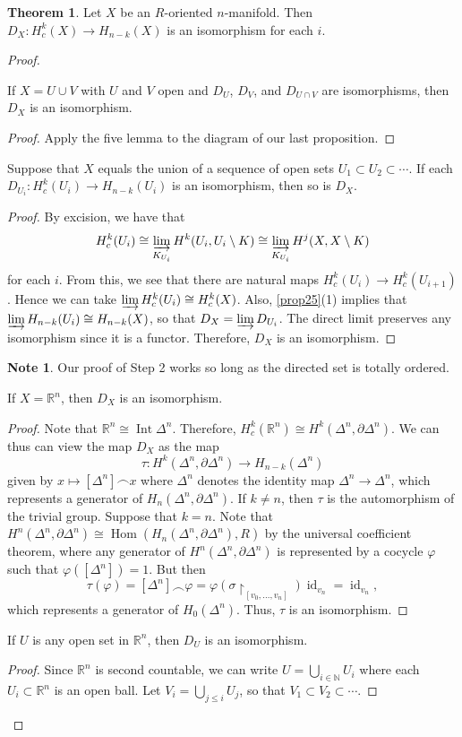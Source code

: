\documentclass[10pt,letterpaper,cm]{nupset}
\theoremstyle{definition}
\newtheorem{note}[definition]{Note}
\theoremstyle{theorem}
\newtheorem{theorem}[definition]{Theorem}
\theoremstyle{remark}
\newcommand{\N}{\mathbb N}
\newcommand{\R}{\mathbb{R}}
\newcommand{\1}{\mathbb{1}}
\newcommand{\0}{\vec 0}
\DeclareMathOperator{\id}{id}
\DeclareMathOperator{\Int}{Int}
\DeclareMathOperator{\Hom}{Hom}
\begin{document}
\begin{theorem}
Let $X$ be an $R$-oriented $n$-manifold.  Then $D_X : H_c^k(X) \to H_{n-k}(X)$ is an isomorphism for each $i$.
\end{theorem}
\begin{proof} $ $
\begin{steps}
\item If $X= U \cup V$ with $U$ and $V$ open and $D_U$, $D_V$, and $D_{U \cap V}$ are isomorphisms, then $D_X$ is an isomorphism.
\begin{proof}
Apply the five lemma to the diagram of our last proposition. 
\end{proof}
\item Suppose that $X$ equals the union of a sequence of open sets $U_1 \subset U_2 \subset \cdots$. If each $D_{U_i} : H^k_c(U_i) \to H_{n-k}(U_i)$ is an isomorphism, then so is $D_X$.
\begin{proof}
By excision, we have that $$H^k_c(U_i) \cong \varinjlim_{K_{U_i}}H^k(U_i, U_i \setminus K) \cong  \varinjlim_{K_{U_i}}H^j(X, X \setminus K) $$ for each $i$. From this, we see that there are natural maps $H^k_c(U_i) \to H^k_c(U_{i+1})$. Hence we can take $\varinjlim H^k_c(U_i) \cong H^k_c(X)$. Also, \cref{prop25}(1) implies that $\varinjlim H_{n-k}(U_i) \cong H_{n-k}(X)$, so that $D_X = \varinjlim D_{U_i}$. The direct limit  preserves any isomorphism  since it is a functor. Therefore, $D_X$ is an isomorphism.
\end{proof}
\begin{note}
Our proof of Step 2 works so long as the directed set is totally ordered.
\end{note}
\item If $X = \R^n$, then $D_X$ is an isomorphism. 
\begin{proof}
Note that $\R^n \cong \Int{\Delta^n}$. Therefore, $H^k_c(\R^n) \cong H^k(\Delta^n, \partial{\Delta^n})$. We can thus can view the map $D_X$ as the map $$\tau : H^k(\Delta^n, \partial{\Delta^n}) \to H_{n-k}(\Delta^n)$$ given by $x \mapsto [\Delta^n] \frown x$ where $\Delta^n$ denotes the identity map $\Delta^n \to \Delta^n$, which represents a generator of $H_n(\Delta^n, \partial{\Delta^n})$. If $k\ne n$, then $\tau$ is the automorphism of the trivial group. Suppose that $k=n$. Note that $H^n(\Delta^n, \partial{\Delta^n}) \cong \Hom(H_n(\Delta^n, \partial{\Delta^n}), R)$ by the universal coefficient theorem, where any generator of $H^n(\Delta^n, \partial{\Delta^n})$ is represented by a cocycle $\varphi$ such that $\varphi([\Delta^n])=1$. But then $$\tau(\varphi) = [\Delta^n] \frown \varphi = \varphi(\sigma \restriction_{[v_0, \ldots, v_n]})\id_{v_n} =\id_{v_n},$$ which represents a generator of $H_0(\Delta^n)$. Thus, $\tau$ is an isomorphism. 
\end{proof}
\item If $U$ is any open set in $\R^n$, then $D_U$ is an isomorphism.
\begin{proof}
Since $\R^n$ is second countable, we can write $U =\bigcup_{i\in \N} U_i$ where each $U_i \subset \R^n$ is an open ball. Let $V_i = \bigcup_{j \leq i} U_j$, so that $V_1 \subset V_2\subset \cdots$. 


\end{proof}
\end{steps}
\end{proof}
\end{document}
